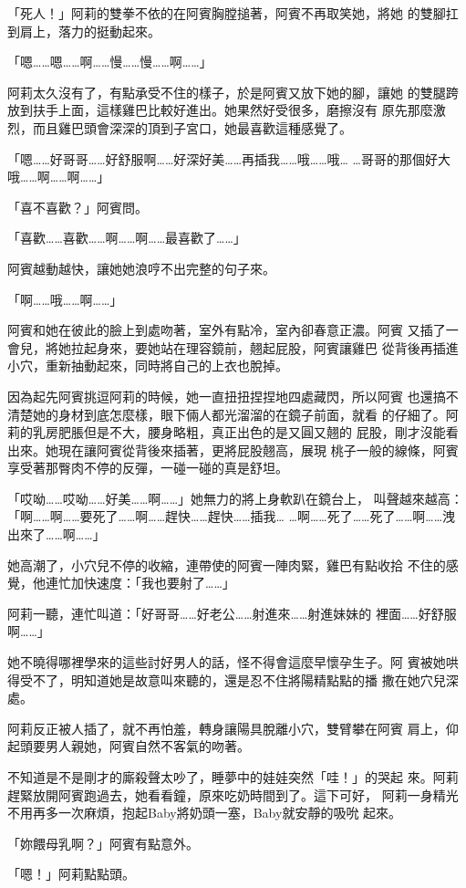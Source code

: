 「死人！」阿莉的雙拳不依的在阿賓胸膛搥著，阿賓不再取笑她，將她
的雙腳扛到肩上，落力的挺動起來。

「嗯……嗯……啊……慢……慢……啊……」

阿莉太久沒有了，有點承受不住的樣子，於是阿賓又放下她的腳，讓她
的雙腿跨放到扶手上面，這樣雞巴比較好進出。她果然好受很多，磨擦沒有
原先那麼激烈，而且雞巴頭會深深的頂到子宮口，她最喜歡這種感覺了。

「嗯……好哥哥……好舒服啊……好深好美……再插我……哦……哦…
…哥哥的那個好大哦……啊……啊……」

「喜不喜歡？」阿賓問。

「喜歡……喜歡……啊……啊……最喜歡了……」

阿賓越動越快，讓她她浪哼不出完整的句子來。

「啊……哦……啊……」

阿賓和她在彼此的臉上到處吻著，室外有點冷，室內卻春意正濃。阿賓
又插了一會兒，將她拉起身來，要她站在理容鏡前，翹起屁股，阿賓讓雞巴
從背後再插進小穴，重新抽動起來，同時將自己的上衣也脫掉。

因為起先阿賓挑逗阿莉的時候，她一直扭扭捏捏地四處藏閃，所以阿賓
也還搞不清楚她的身材到底怎麼樣，眼下倆人都光溜溜的在鏡子前面，就看
的仔細了。阿莉的乳房肥脹但是不大，腰身略粗，真正出色的是又圓又翹的
屁股，剛才沒能看出來。她現在讓阿賓從背後來插著，更將屁股翹高，展現
桃子一般的線條，阿賓享受著那臀肉不停的反彈，一碰一碰的真是舒坦。

「哎呦……哎呦……好美……啊……」她無力的將上身軟趴在鏡台上，
叫聲越來越高：「啊……啊……要死了……啊……趕快……趕快……插我…
…啊……死了……死了……啊……洩出來了……啊……」

她高潮了，小穴兒不停的收縮，連帶使的阿賓一陣肉緊，雞巴有點收拾
不住的感覺，他連忙加快速度：「我也要射了……」

阿莉一聽，連忙叫道：「好哥哥……好老公……射進來……射進妹妹的
裡面……好舒服啊……」

她不曉得哪裡學來的這些討好男人的話，怪不得會這麼早懷孕生子。阿
賓被她哄得受不了，明知道她是故意叫來聽的，還是忍不住將陽精點點的播
撒在她穴兒深處。

阿莉反正被人插了，就不再怕羞，轉身讓陽具脫離小穴，雙臂攀在阿賓
肩上，仰起頭要男人親她，阿賓自然不客氣的吻著。

不知道是不是剛才的廝殺聲太吵了，睡夢中的娃娃突然「哇！」的哭起
來。阿莉趕緊放開阿賓跑過去，她看看鐘，原來吃奶時間到了。這下可好，
阿莉一身精光不用再多一次麻煩，抱起Baby將奶頭一塞，Baby就安靜的吸吮
起來。

「妳餵母乳啊？」阿賓有點意外。

「嗯！」阿莉點點頭。

